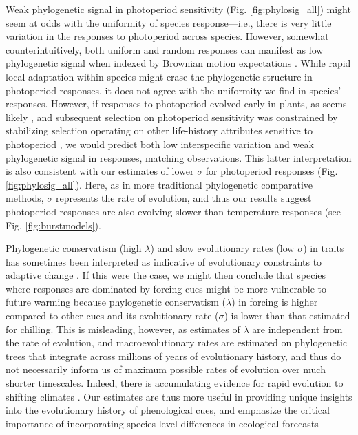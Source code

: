 \documentclass[11pt]{article}
\begin{document}
Weak phylogenetic signal in photoperiod sensitivity (Fig. \ref{fig:phylosig_all}) might seem at odds with the uniformity of species response---i.e., there is very little variation in the responses to photoperiod across species. However, somewhat counterintuitively, both uniform and random responses can manifest as low phylogenetic signal when indexed by Brownian motion expectations \citep{wiens2010niche}. While rapid local adaptation within species might erase the phylogenetic structure in photoperiod responses, it does not agree with the uniformity we find in species' responses. However, if responses to photoperiod evolved early in plants, as seems likely \citep{serrano2017}, and subsequent selection on photoperiod sensitivity was constrained by stabilizing selection operating on other life-history attributes sensitive to photoperiod \citep[e.g.,][]{Rinne:1994,Wilczek2014,azeez2015}, we would predict both low interspecific variation and weak phylogenetic signal in responses, matching observations. This latter interpretation is also consistent with our estimates of lower $\sigma$ for photoperiod responses (Fig. \ref{fig:phylosig_all}). Here, as in more traditional phylogenetic comparative methods, $\sigma$ represents the rate of evolution, and thus our results suggest photoperiod responses are also evolving slower than temperature responses (see Fig. \ref{fig:burstmodels}).

Phylogenetic conservatism (high $\lambda$) and slow evolutionary rates (low $\sigma$) in traits has sometimes been interpreted as indicative of evolutionary constraints to adaptive change \citep{wiens2010niche,bennett2021evolution}. If this were the case, we might then conclude that species where responses are dominated by forcing cues might be more vulnerable to future warming because phylogenetic conservatism ($\lambda$) in forcing is higher compared to other cues and its evolutionary rate ($\sigma$) is lower than that estimated for chilling. This is misleading, however, as estimates of $\lambda$ are independent from the rate of evolution, and macroevolutionary rates are estimated on phylogenetic trees that integrate across millions of years of evolutionary history, and thus do not necessarily inform us of maximum possible rates of evolution over much shorter timescales. Indeed, there is accumulating evidence for rapid evolution to shifting climates \citep{bradshaw2006,franks2014}. Our estimates are thus more useful in providing unique insights into the evolutionary history of phenological cues, and emphasize the critical importance of incorporating species-level differences in ecological forecasts
\end{document}
